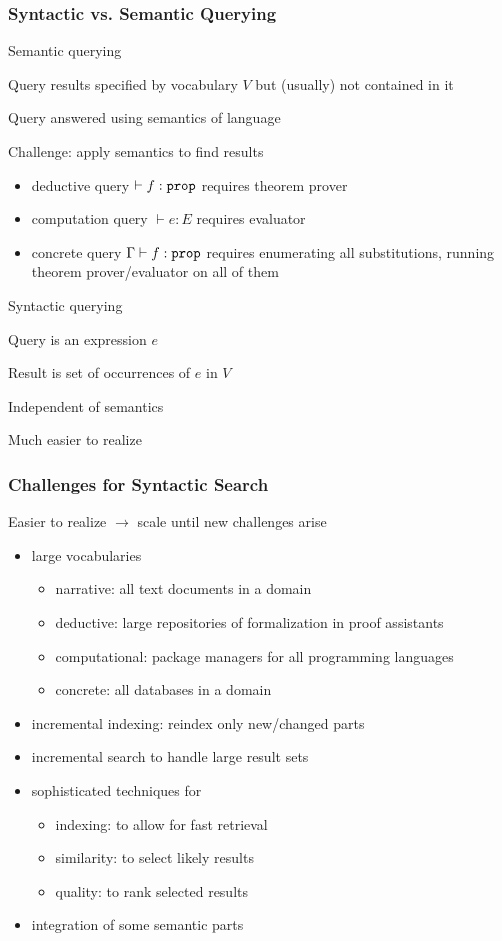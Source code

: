 \begin{frame}\frametitle{Syntactic vs. Semantic Querying}
\begin{blockitems}{Semantic querying}
\item Query results specified by vocabulary $V$ but (usually) not contained in it
\item Query answered using semantics of language
\item Challenge: apply semantics to find results
 \begin{itemize}
 \item deductive query $\vdash f:\mathtt{prop}$ requires theorem prover 
 \item computation query $\vdash e:E$ requires evaluator
 \item concrete query $\Gamma\vdash f:\mathtt{prop}$ requires enumerating all substitutions, running theorem prover/evaluator on all of them
 \end{itemize}
\end{blockitems}

\begin{blockitems}{Syntactic querying}
\item Query is an expression $e$
\item Result is set of occurrences of $e$ in $V$
\item Independent of semantics
\item Much easier to realize
\end{blockitems}
\end{frame}

\begin{frame}\frametitle{Challenges for Syntactic Search}
Easier to realize $\to$ scale until new challenges arise
\begin{itemize}
\item large vocabularies
 \begin{itemize}
 \item narrative: all text documents in a domain 
 \item deductive: large repositories of formalization in proof assistants
 \item computational: package managers for all programming languages
 \item concrete: all databases in a domain 
 \end{itemize}
\item incremental indexing: reindex only new/changed parts
\item incremental search to handle large result sets 
\item sophisticated techniques for
 \begin{itemize}
 \item indexing: to allow for fast retrieval
 \item similarity: to select likely results
 \item quality: to rank selected results
\end{itemize}
\item integration of some semantic parts
\end{itemize}
\end{frame}

